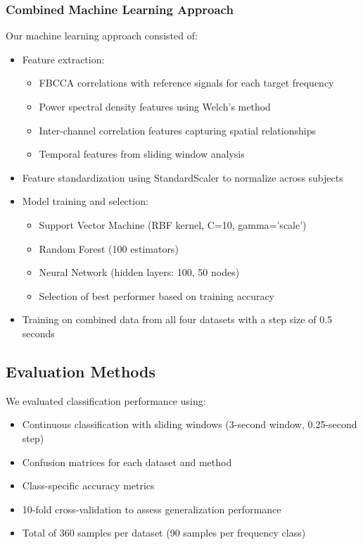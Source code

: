 \documentclass[conference]{IEEEtran}
\begin{document}
\subsubsection{Combined Machine Learning Approach}
Our machine learning approach consisted of:
\begin{itemize}
    \item Feature extraction:
    \begin{itemize}
        \item FBCCA correlations with reference signals for each target frequency
        \item Power spectral density features using Welch's method
        \item Inter-channel correlation features capturing spatial relationships
        \item Temporal features from sliding window analysis
    \end{itemize}
    \item Feature standardization using StandardScaler to normalize across subjects
    \item Model training and selection:
    \begin{itemize}
        \item Support Vector Machine (RBF kernel, C=10, gamma='scale')
        \item Random Forest (100 estimators)
        \item Neural Network (hidden layers: 100, 50 nodes)
        \item Selection of best performer based on training accuracy
    \end{itemize}
    \item Training on combined data from all four datasets with a step size of 0.5 seconds
\end{itemize}

\subsection{Evaluation Methods}
We evaluated classification performance using:
\begin{itemize}
    \item Continuous classification with sliding windows (3-second window, 0.25-second step)
    \item Confusion matrices for each dataset and method
    \item Class-specific accuracy metrics
    \item 10-fold cross-validation to assess generalization performance
    \item Total of 360 samples per dataset (90 samples per frequency class)
\end{itemize}
\end{document}
